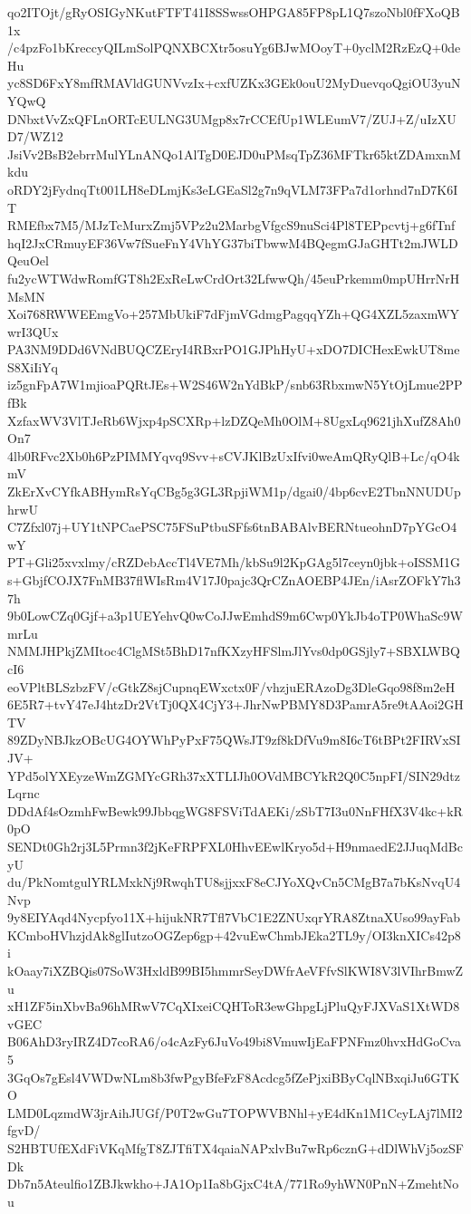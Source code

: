 qo2ITOjt/gRyOSIGyNKutFTFT41I8SSwssOHPGA85FP8pL1Q7szoNbl0fFXoQB1x
/c4pzFo1bKreccyQILmSolPQNXBCXtr5osuYg6BJwMOoyT+0yclM2RzEzQ+0deHu
yc8SD6FxY8mfRMAVldGUNVvzIx+cxfUZKx3GEk0ouU2MyDuevqoQgiOU3yuNYQwQ
DNbxtVvZxQFLnORTcEULNG3UMgp8x7rCCEfUp1WLEumV7/ZUJ+Z/uIzXUD7/WZ12
JsiVv2BsB2ebrrMulYLnANQo1AlTgD0EJD0uPMsqTpZ36MFTkr65ktZDAmxnMkdu
oRDY2jFydnqTt001LH8eDLmjKs3eLGEaSl2g7n9qVLM73FPa7d1orhnd7nD7K6IT
RMEfbx7M5/MJzTcMurxZmj5VPz2u2MarbgVfgcS9nuSci4Pl8TEPpcvtj+g6fTnf
hqI2JxCRmuyEF36Vw7fSueFnY4VhYG37biTbwwM4BQegmGJaGHTt2mJWLDQeuOel
fu2ycWTWdwRomfGT8h2ExReLwCrdOrt32LfwwQh/45euPrkemm0mpUHrrNrHMsMN
Xoi768RWWEEmgVo+257MbUkiF7dFjmVGdmgPagqqYZh+QG4XZL5zaxmWYwrI3QUx
PA3NM9DDd6VNdBUQCZEryI4RBxrPO1GJPhHyU+xDO7DICHexEwkUT8meS8XiIiYq
iz5gnFpA7W1mjioaPQRtJEs+W2S46W2nYdBkP/snb63RbxmwN5YtOjLmue2PPfBk
XzfaxWV3VlTJeRb6Wjxp4pSCXRp+lzDZQeMh0OlM+8UgxLq9621jhXufZ8Ah0On7
4lb0RFvc2Xb0h6PzPIMMYqvq9Svv+sCVJKlBzUxIfvi0weAmQRyQlB+Lc/qO4kmV
ZkErXvCYfkABHymRsYqCBg5g3GL3RpjiWM1p/dgai0/4bp6cvE2TbnNNUDUphrwU
C7Zfxl07j+UY1tNPCaePSC75FSuPtbuSFfs6tnBABAlvBERNtueohnD7pYGcO4wY
PT+Gli25xvxlmy/cRZDebAccTl4VE7Mh/kbSu9l2KpGAg5l7ceyn0jbk+oISSM1G
s+GbjfCOJX7FnMB37flWIsRm4V17J0pajc3QrCZnAOEBP4JEn/iAsrZOFkY7h37h
9b0LowCZq0Gjf+a3p1UEYehvQ0wCoJJwEmhdS9m6Cwp0YkJb4oTP0WhaSc9WmrLu
NMMJHPkjZMItoc4ClgMSt5BhD17nfKXzyHFSlmJlYvs0dp0GSjly7+SBXLWBQcI6
eoVPltBLSzbzFV/cGtkZ8sjCupnqEWxctx0F/vhzjuERAzoDg3DleGqo98f8m2eH
6E5R7+tvY47eJ4htzDr2VtTj0QX4CjY3+JhrNwPBMY8D3PamrA5re9tAAoi2GHTV
89ZDyNBJkzOBcUG4OYWhPyPxF75QWsJT9zf8kDfVu9m8I6cT6tBPt2FIRVxSIJV+
YPd5olYXEyzeWmZGMYcGRh37xXTLIJh0OVdMBCYkR2Q0C5npFI/SIN29dtzLqrnc
DDdAf4sOzmhFwBewk99JbbqgWG8FSViTdAEKi/zSbT7I3u0NnFHfX3V4kc+kR0pO
SENDt0Gh2rj3L5Prmn3f2jKeFRPFXL0HhvEEwlKryo5d+H9nmaedE2JJuqMdBcyU
du/PkNomtgulYRLMxkNj9RwqhTU8sjjxxF8eCJYoXQvCn5CMgB7a7bKsNvqU4Nvp
9y8EIYAqd4Nycpfyo11X+hijukNR7Tfl7VbC1E2ZNUxqrYRA8ZtnaXUso99ayFab
KCmboHVhzjdAk8glIutzoOGZep6gp+42vuEwChmbJEka2TL9y/OI3knXICs42p8i
kOaay7iXZBQis07SoW3HxldB99BI5hmmrSeyDWfrAeVFfvSlKWI8V3lVIhrBmwZu
xH1ZF5inXbvBa96hMRwV7CqXIxeiCQHToR3ewGhpgLjPluQyFJXVaS1XtWD8vGEC
B06AhD3ryIRZ4D7coRA6/o4cAzFy6JuVo49bi8VmuwIjEaFPNFmz0hvxHdGoCva5
3GqOs7gEsl4VWDwNLm8b3fwPgyBfeFzF8Acdcg5fZePjxiBByCqlNBxqiJu6GTKO
LMD0LqzmdW3jrAihJUGf/P0T2wGu7TOPWVBNhl+yE4dKn1M1CcyLAj7lMI2fgvD/
S2HBTUfEXdFiVKqMfgT8ZJTfiTX4qaiaNAPxlvBu7wRp6cznG+dDlWhVj5ozSFDk
Db7n5Ateulfio1ZBJkwkho+JA1Op1Ia8bGjxC4tA/771Ro9yhWN0PnN+ZmehtNou
